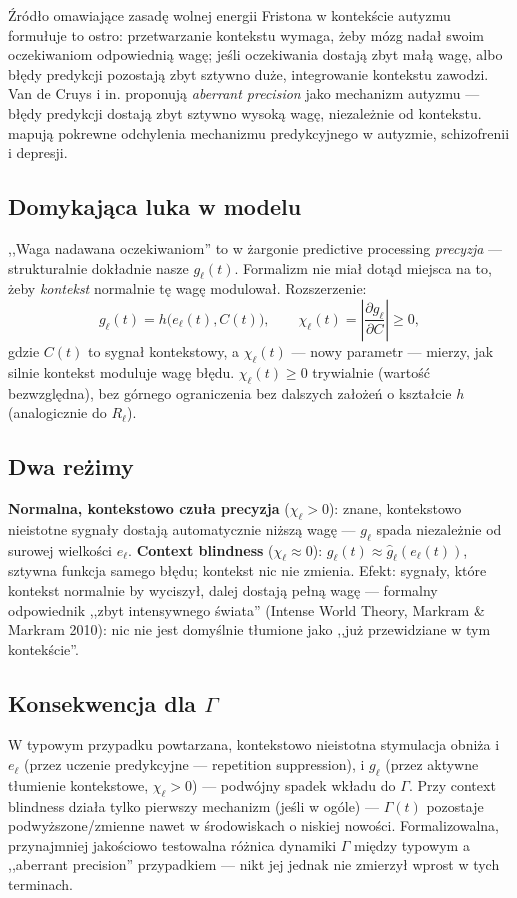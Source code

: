 \documentclass[11pt]{article}
\begin{document}
Źródło omawiające zasadę wolnej energii Fristona w kontekście autyzmu \cite{vandecruys2014} formułuje to ostro: przetwarzanie kontekstu wymaga, żeby mózg nadał swoim oczekiwaniom odpowiednią wagę; jeśli oczekiwania dostają zbyt małą wagę, albo błędy predykcji pozostają zbyt sztywno duże, integrowanie kontekstu zawodzi. Van de Cruys i in. proponują \emph{aberrant precision} jako mechanizm autyzmu --- błędy predykcji dostają zbyt sztywno wysoką wagę, niezależnie od kontekstu. \cite{qela2025} mapują pokrewne odchylenia mechanizmu predykcyjnego w autyzmie, schizofrenii i depresji.

\subsection*{Domykająca luka w modelu}
,,Waga nadawana oczekiwaniom'' to w żargonie predictive processing \emph{precyzja} --- strukturalnie dokładnie nasze $g_\ell(t)$. Formalizm nie miał dotąd miejsca na to, żeby \emph{kontekst} normalnie tę wagę modulował. Rozszerzenie:
\[
g_\ell(t) = h\big(e_\ell(t), C(t)\big), \qquad \chi_\ell(t) = \left|\frac{\partial g_\ell}{\partial C}\right| \ge 0,
\]
gdzie $C(t)$ to sygnał kontekstowy, a $\chi_\ell(t)$ --- nowy parametr --- mierzy, jak silnie kontekst moduluje wagę błędu. $\chi_\ell(t)\ge0$ trywialnie (wartość bezwzględna), bez górnego ograniczenia bez dalszych założeń o kształcie $h$ (analogicznie do $R_\ell$).

\subsection*{Dwa reżimy}
\textbf{Normalna, kontekstowo czuła precyzja} ($\chi_\ell>0$): znane, kontekstowo nieistotne sygnały dostają automatycznie niższą wagę --- $g_\ell$ spada niezależnie od surowej wielkości $e_\ell$. \textbf{Context blindness} ($\chi_\ell\approx0$): $g_\ell(t)\approx\hat g_\ell(e_\ell(t))$, sztywna funkcja samego błędu; kontekst nic nie zmienia. Efekt: sygnały, które kontekst normalnie by wyciszył, dalej dostają pełną wagę --- formalny odpowiednik ,,zbyt intensywnego świata'' (Intense World Theory, Markram \& Markram 2010): nic nie jest domyślnie tłumione jako ,,już przewidziane w tym kontekście''.

\subsection*{Konsekwencja dla $\Gamma$}
W typowym przypadku powtarzana, kontekstowo nieistotna stymulacja obniża i $e_\ell$ (przez uczenie predykcyjne --- repetition suppression), i $g_\ell$ (przez aktywne tłumienie kontekstowe, $\chi_\ell>0$) --- podwójny spadek wkładu do $\Gamma$. Przy context blindness działa tylko pierwszy mechanizm (jeśli w ogóle) --- $\Gamma(t)$ pozostaje podwyższone/zmienne nawet w środowiskach o niskiej nowości. Formalizowalna, przynajmniej jakościowo testowalna różnica dynamiki $\Gamma$ między typowym a ,,aberrant precision'' przypadkiem --- nikt jej jednak nie zmierzył wprost w tych terminach.
\end{document}
